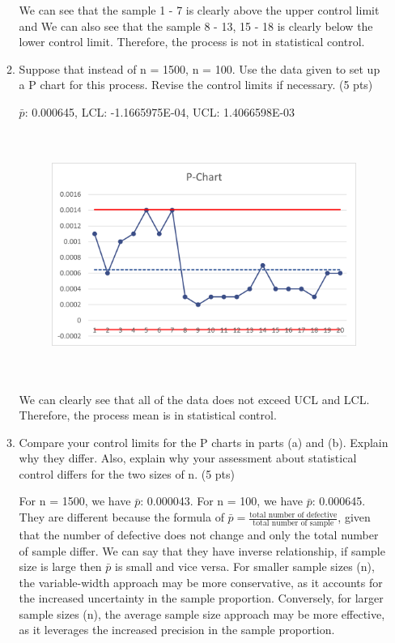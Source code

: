 \documentclass{article}
\begin{document}
\begin{enumerate}
\begin{enumerate}
        We can see that the sample 1 - 7 is clearly above the upper control limit and We can also see that the sample 8 - 13, 15 - 18 is clearly below the lower control limit.
        Therefore, the process is not in statistical control. 

        \newpage

        \item Suppose that instead of n = 1500, n = 100. Use the data given to set up a P chart for this process. Revise the control limits if necessary. (5 pts)
        
        $\bar{p}$: 0.000645, LCL: -1.1665975E-04, UCL: 1.4066598E-03
        \begin{figure}[!htbp]
            \centerline{\includegraphics[width=10cm,height=8cm,keepaspectratio]{Picture 5.png}}
        \end{figure}

        We can clearly see that all of the data does not exceed UCL and LCL. Therefore, the process mean is in statistical control. 

        \item Compare your control limits for the P charts in parts (a) and (b). Explain why they differ. Also, explain why your assessment about statistical control differs for the two sizes of n. (5 pts)
        
        For n = 1500, we have $\bar{p}$: 0.000043. For n = 100, we have $\bar{p}$: 0.000645. They are different because the formula of $\bar{p} = \frac{\text{total number of defective}}{\text{total number of sample}}$, given that the number of defective does not change and only the total number of sample differ. 
        We can say that they have inverse relationship, if sample size is large then $\bar{p}$ is small and vice versa.  
        For smaller sample sizes (n), the variable-width approach may be more conservative, as it accounts for the increased uncertainty in the sample proportion. 
        Conversely, for larger sample sizes (n), the average sample size approach may be more effective, as it leverages the increased precision in the sample proportion.
    \end{enumerate}
\end{enumerate} 
\end{document}
